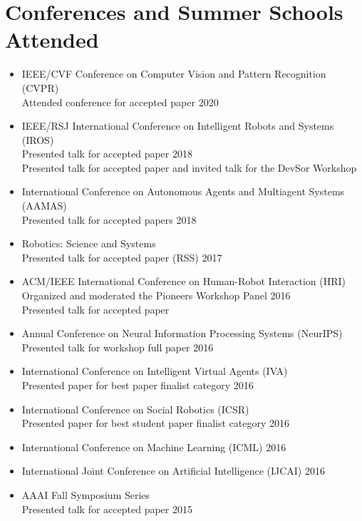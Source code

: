 \documentclass[10pt,letterpaper]{article}
\newcommand{\thing}[2]{{#1} \hfill {#2}}
\begin{document}
\section{Conferences and Summer Schools Attended}
\begin{itemize}%
\item \thing{IEEE/CVF Conference on Computer Vision and Pattern Recognition (CVPR)\\Attended conference for accepted paper}{2020}
\item \thing{IEEE/RSJ International Conference on Intelligent Robots and Systems (IROS)\\Presented talk for accepted paper}{2018}\\
         Presented talk for accepted paper and invited talk for the DevSor Workshop 
\item \thing{International Conference on Autonomous Agents and Multiagent Systems (AAMAS)\\Presented talk for accepted papers}{2018}
\item \thing{Robotics: Science and Systems\\Presented talk for accepted paper (RSS)}{2017}
\item \thing{ACM/IEEE International Conference on Human-Robot Interaction (HRI)\\Organized and moderated the Pioneers Workshop Panel }{2016}\\
        Presented talk for accepted paper 
\item \thing{Annual Conference on Neural Information Processing Systems (NeurIPS)\\Presented talk for workshop full paper}{2016}
\item \thing{International Conference on Intelligent Virtual Agents (IVA)\\Presented paper for best paper finalist category}{2016}
\item \thing{International Conference on Social Robotics (ICSR)\\Presented paper for best student paper finalist category}{2016}
\item \thing{International Conference on Machine Learning (ICML)}{2016}
\item \thing{International Joint Conference on Artificial Intelligence (IJCAI)}{2016}
\item \thing{AAAI Fall Symposium Series\\Presented talk for accepted paper}{2015}

\end{itemize}
\end{document}
